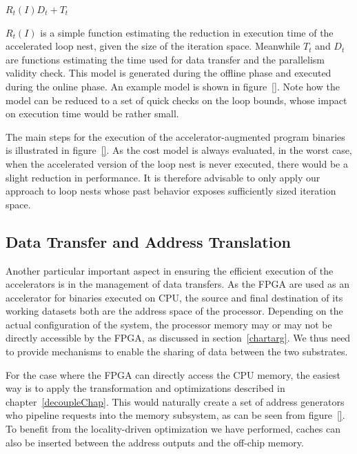 $R_t(I)  D_t + T_t$

$R_t(I)$ is a simple function estimating the reduction in execution time of the accelerated loop nest, given the size of the iteration space. Meanwhile $T_t$ and $D_t$ are functions
estimating the time used for data transfer and the parallelism validity check. This model is
generated during the offline phase and executed during the online phase. An example model
is shown in figure~\ref{}. Note how the model can be reduced to a set of quick checks
on the loop bounds, whose impact on execution time would be rather small.


The main steps for the execution of the accelerator-augmented program binaries is illustrated in figure~\ref{}. As the cost model is always evaluated, in the worst case, when
the accelerated version of the loop nest is never executed, there would be a slight reduction in performance. It is therefore advisable to only apply our approach to loop nests whose
past behavior exposes sufficiently sized iteration space.



\subsection{Data Transfer and Address Translation}
\label{dtransfer}
Another particular important aspect in ensuring the efficient execution of the accelerators is in the management of data transfers.
As the FPGA are used as an accelerator for binaries executed on CPU, the source
and final destination of its working datasets both are the address space of
the processor. Depending on the actual configuration of the system, the processor memory may or may not be directly accessible by the FPGA, as discussed in section~\ref{chartarg}. We thus need to provide mechanisms to enable
the sharing of data between the two substrates.


For the case where the FPGA can directly access the 
CPU memory, the easiest way is to apply the transformation and
optimizations described in chapter~\ref{decoupleChap}. This would
naturally create a set of address generators who pipeline requests into the 
memory subsystem, as can be seen from figure~\ref{}. To benefit from the locality-driven optimization we 
have performed, caches can also be inserted between the address outputs and the
off-chip memory. 


